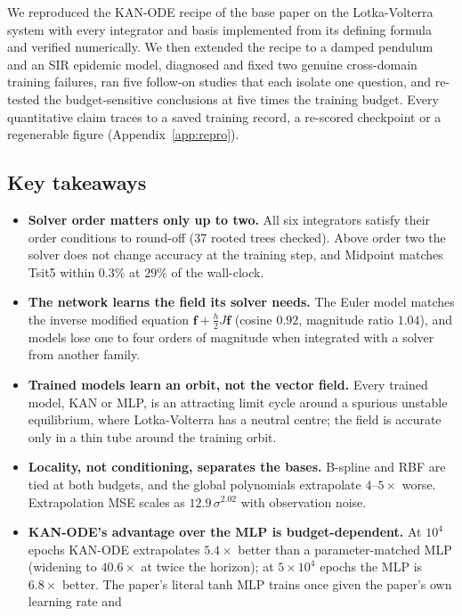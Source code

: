 We reproduced the KAN-ODE recipe of the base paper on the Lotka-Volterra
system with every integrator and basis implemented from its defining formula
and verified numerically. We then extended the recipe to a damped pendulum
and an SIR epidemic model, diagnosed and fixed two genuine cross-domain
training failures, ran five follow-on studies that each isolate one
question, and re-tested the budget-sensitive conclusions at five times the
training budget. Every quantitative claim traces to a saved training record, a
re-scored checkpoint or a regenerable figure (Appendix~\ref{app:repro}).

\subsection{Key takeaways}

\begin{itemize}[leftmargin=1.2em]
\item \textbf{Solver order matters only up to two.} All six integrators
  satisfy their order conditions to round-off (37 rooted trees checked).
  Above order two the solver does not change accuracy at the training step,
  and Midpoint matches Tsit5 within $0.3\%$ at $29\%$ of the wall-clock.
\item \textbf{The network learns the field its solver needs.} The Euler
  model matches the inverse modified equation
  $\mathbf{f}+\tfrac{h}{2}J\mathbf{f}$ (cosine $0.92$, magnitude ratio
  $1.04$), and models lose one to four orders of magnitude when integrated
  with a solver from another family.
\item \textbf{Trained models learn an orbit, not the vector field.} Every
  trained model, KAN or MLP, is an attracting limit cycle around a spurious
  unstable equilibrium, where Lotka-Volterra has a neutral centre; the field
  is accurate only in a thin tube around the training orbit.
\item \textbf{Locality, not conditioning, separates the bases.} B-spline and
  RBF are tied at both budgets, and the global polynomials extrapolate
  $4$--$5\times$ worse. Extrapolation MSE scales as $12.9\,\sigma^{2.02}$
  with observation noise.
\item \textbf{KAN-ODE's advantage over the MLP is budget-dependent.} At
  $10^4$ epochs KAN-ODE extrapolates $5.4\times$ better than a
  parameter-matched MLP (widening to $40.6\times$ at twice the horizon); at
  $5\times10^4$ epochs the MLP is $6.8\times$ better. The paper's literal
  tanh MLP trains once given the paper's own learning rate and

\end{itemize}
